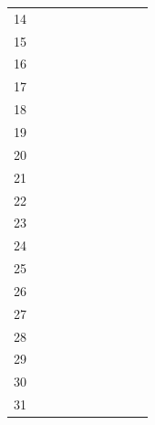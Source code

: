 \begin{table}
{\begin{tabular}{c c c c c c c c c c}
			14 &   &   &   &   & \cellcolor{orange} &   & \cellcolor{brown} &   &   \\
			15 &   &   &   &   &   &   &   &   & \\
			16 &   & \cellcolor{Gray} & \cellcolor{black} & \cellcolor{yellow} & \cellcolor{orange} &   & \cellcolor{brown} &   & \cellcolor{green} \\
			17 &   &   &   &   &   &   &   &   & \\
			18 &   &   &   &   &   &   &   &   & \\
			19 & \cellcolor{lightgray} & \cellcolor{Gray} & \cellcolor{black} & \cellcolor{yellow} & \cellcolor{orange} & \cellcolor{red} & \cellcolor{brown} & \cellcolor{lime} & \cellcolor{green}\\
			20 &   &   & \cellcolor{black} & \cellcolor{yellow} & \cellcolor{orange} & \cellcolor{red} & \cellcolor{brown} & \cellcolor{lime} & \cellcolor{green} \\
			21 &   &   &   &   & \cellcolor{orange} &   & \cellcolor{brown} &   & \\
			22 & \cellcolor{lightgray} & \cellcolor{Gray} & \cellcolor{black} &   & \cellcolor{orange} & \cellcolor{red} & \cellcolor{brown} & \cellcolor{lime} & \cellcolor{green} \\
			23 &   &   & \cellcolor{black} & \cellcolor{yellow} & \cellcolor{orange} &   & \cellcolor{brown} & \cellcolor{lime} &  \\
			24 &   &   &   &   &   &   &   &   & \\
			25 &   &   & \cellcolor{black} & \cellcolor{yellow} & \cellcolor{orange} &   & \cellcolor{brown} &   & \cellcolor{green} \\
			26 &   &   &   &   &   &   &   &   & \\
			27 &   &   &   &   &   &   &   &   & \\
			28 & \cellcolor{lightgray} & \cellcolor{Gray} & \cellcolor{black} & \cellcolor{yellow} & \cellcolor{orange} & \cellcolor{red} & \cellcolor{brown} & \cellcolor{lime} & \cellcolor{green} \\
			29 &   & \cellcolor{Gray} & \cellcolor{black} & \cellcolor{yellow} & \cellcolor{orange} & \cellcolor{red} & \cellcolor{brown} & \cellcolor{lime} & \cellcolor{green} \\
			30 &   &   &   &   &   &   &   &   & \\
			31 & \cellcolor{lightgray} & \cellcolor{Gray} & \cellcolor{black} & \cellcolor{yellow} & \cellcolor{orange} & \cellcolor{red} & \cellcolor{brown} & \cellcolor{lime} & \cellcolor{green} \\

\end{tabular}}
\end{table}

